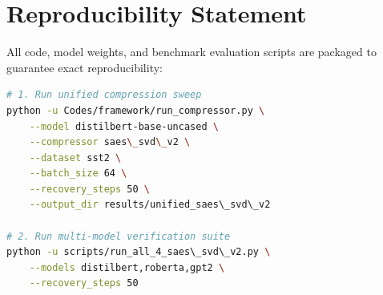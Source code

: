 \section{Reproducibility Statement}
All code, model weights, and benchmark evaluation scripts are packaged to guarantee exact reproducibility:
\begin{lstlisting}[language=bash]
# 1. Run unified compression sweep
python -u Codes/framework/run_compressor.py \
    --model distilbert-base-uncased \
    --compressor saes\_svd\_v2 \
    --dataset sst2 \
    --batch_size 64 \
    --recovery_steps 50 \
    --output_dir results/unified_saes\_svd\_v2

# 2. Run multi-model verification suite
python -u scripts/run_all_4_saes\_svd\_v2.py \
    --models distilbert,roberta,gpt2 \
    --recovery_steps 50
\end{lstlisting}
